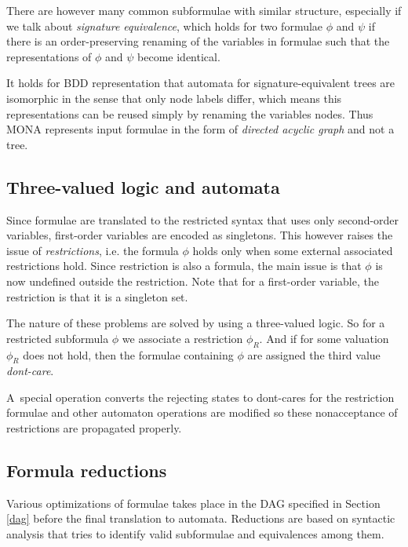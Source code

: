 There are however many common subformulae with similar structure, especially if
we talk about \emph{signature equivalence}, which holds for two formulae $\phi$
and $\psi$ if there is an order-preserving renaming of the variables in formulae
such that the representations of $\phi$ and $\psi$ become identical.

It holds for BDD representation that automata for signature-equivalent trees are
isomorphic in the sense that only node labels differ, which means this
representations can be reused simply by renaming the variables nodes. Thus MONA
represents input formulae in the form of \emph{directed acyclic graph} and not a
tree.

\subsection{Three-valued logic and automata}
Since formulae are translated to the restricted syntax that uses only
second-order variables, first-order variables are encoded as singletons. This
however raises the issue of \emph{restrictions}, i.e. the formula $\phi$ holds
only when some external associated restrictions hold. Since restriction is also
a formula, the main issue is that $\phi$ is now undefined outside the
restriction. Note that for a first-order variable, the restriction is that it is
a singleton set.

The nature of these problems are solved by using a three-valued logic. So for a
restricted subformula $\phi$ we associate a restriction $\phi_R$. And if for
some valuation $\phi_R$ does not hold, then the formulae containing $\phi$ are
assigned the third value \emph{dont-care}.

A~special operation converts the rejecting states to dont-cares for the
restriction formulae and other automaton operations are modified so these
nonacceptance of restrictions are propagated properly.

\subsection{Formula reductions}
Various optimizations of formulae takes place in the DAG specified in Section
\ref{dag} before the final translation to automata. Reductions are based on
syntactic analysis that tries to identify valid subformulae and equivalences
among them.

